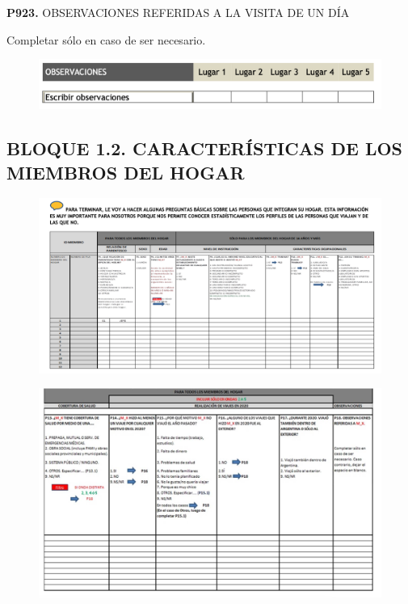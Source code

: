 \documentclass[
  openany]{book}
\begin{document}
\textbf{P923.} OBSERVACIONES REFERIDAS A LA VISITA DE UN DÍA

Completar sólo en caso de ser necesario.

\begin{figure}

{\centering \includegraphics[width=1\linewidth]{imagenes/figura6-298} 

}

\end{figure}

\hypertarget{bloque-1.2.-caracteruxedsticas-de-los-miembros-del-hogar}{%
\subsection{\texorpdfstring{\textbf{BLOQUE 1.2. CARACTERÍSTICAS DE LOS MIEMBROS DEL HOGAR}}{BLOQUE 1.2. CARACTERÍSTICAS DE LOS MIEMBROS DEL HOGAR}}\label{bloque-1.2.-caracteruxedsticas-de-los-miembros-del-hogar}}

\begin{figure}

{\centering \includegraphics[width=1\linewidth]{imagenes/figura6-299} 

}

\end{figure}
\begin{figure}

{\centering \includegraphics[width=1\linewidth]{imagenes/figura6-300} 

}

\end{figure}
\end{document}
